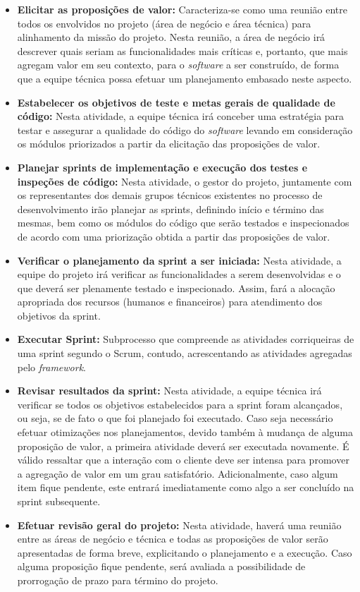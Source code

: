 \begin{itemize}
	\item \textbf{Elicitar as proposições de valor:} Caracteriza-se como uma reunião entre todos os envolvidos no projeto (área de negócio e área técnica) para alinhamento da missão do projeto. Nesta reunião, a área de negócio irá descrever quais seriam as funcionalidades mais críticas e, portanto, que mais agregam valor em seu contexto, para o \textit{software} a ser construído, de forma que a equipe técnica possa efetuar um planejamento embasado neste aspecto.

	\item \textbf{Estabelecer os objetivos de teste e metas gerais de qualidade de código:} Nesta atividade, a equipe técnica irá conceber uma estratégia para testar e assegurar a qualidade do código do \textit{software} levando em consideração os módulos priorizados a partir da elicitação das proposições de valor.

	\item \textbf{Planejar sprints de implementação e execução dos testes e inspeções de código:} Nesta atividade, o gestor do projeto, juntamente com os representantes dos demais grupos técnicos existentes no processo de desenvolvimento irão planejar as sprints, definindo início e término das mesmas, bem como os módulos do código que serão testados e inspecionados de acordo com uma priorização obtida a partir das proposições de valor.

	\item \textbf{Verificar o planejamento da sprint a ser iniciada:} Nesta atividade, a equipe do projeto irá verificar as funcionalidades a serem desenvolvidas e o que deverá ser plenamente testado e inspecionado. Assim, fará a alocação apropriada dos recursos (humanos e financeiros) para atendimento dos objetivos da sprint.

	\item \textbf{Executar Sprint:} Subprocesso que compreende as atividades corriqueiras de uma sprint segundo o Scrum, contudo, acrescentando as atividades agregadas pelo \textit{framework}.

	\item \textbf{Revisar resultados da sprint:} Nesta atividade, a equipe técnica irá verificar se todos os objetivos estabelecidos para a sprint foram alcançados, ou seja, se de fato o que foi planejado foi executado. Caso seja necessário efetuar otimizações nos planejamentos, devido também à mudança de alguma proposição de valor, a primeira atividade deverá ser executada novamente. É válido ressaltar que a interação com o cliente deve ser intensa para promover a agregação de valor em um grau satisfatório. Adicionalmente, caso algum item fique pendente, este entrará imediatamente como algo a ser concluído na sprint subsequente.

	\item \textbf{Efetuar revisão geral do projeto:} Nesta atividade, haverá uma reunião entre as áreas de negócio e técnica e todas as proposições de valor serão apresentadas de forma breve, explicitando o planejamento e a execução. Caso alguma proposição fique pendente, será avaliada a possibilidade de prorrogação de prazo para término do projeto.
\end{itemize}

